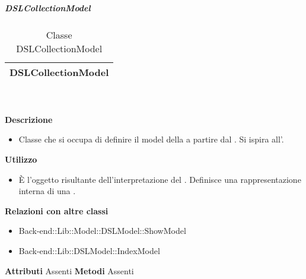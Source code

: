 			\subparagraph{DSLCollectionModel} 
\begin{table}[ht]
\begin{center}
\bgroup
	\setlength{\arrayrulewidth}{0.6mm}
	\def\arraystretch{1}
		\begin{tabular}{ | p{12cm} | }
				\hline  
					\centerline{\textbf{DSLCollectionModel}}
		\\ \hline 
				\hline
				\hline
		
		\end{tabular}
\egroup
\caption{Classe DSLCollectionModel}
\end{center}
\end{table} \textbf{\\ \\ Descrizione}
\begin{itemize}
\item[] Classe che si occupa di definire il model della  a partire dal . Si ispira all'.
\end{itemize} 
\textbf{Utilizzo}
\begin{itemize}
\item[] È l'oggetto risultante dell'interpretazione del . Definisce una rappresentazione interna di una .
\end{itemize}
\textbf{Relazioni con altre classi}
\begin{itemize}
\item{Back-end::Lib::Model::DSLModel::ShowModel}
\item{Back-end::Lib::DSLModel::IndexModel}
\end{itemize}
\textbf{Attributi}
Assenti
\textbf{Metodi}
Assenti

